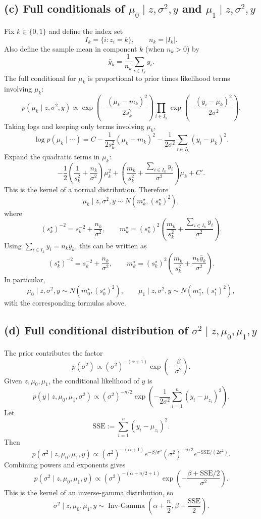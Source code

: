 \documentclass[11pt]{article}
\begin{document}
\subsection*{(c) Full conditionals of $\mu_0\mid z,\sigma^2,y$ and $\mu_1\mid z,\sigma^2,y$}
Fix $k\in\{0,1\}$ and define the index set
\[
I_k=\{i:z_i=k\},
\qquad n_k=|I_k|.
\]
Also define the sample mean in component $k$ (when $n_k>0$) by
\[
\bar y_k=\frac1{n_k}\sum_{i\in I_k} y_i.
\]
The full conditional for $\mu_k$ is proportional to prior times likelihood terms involving $\mu_k$:
\[
p(\mu_k\mid z,\sigma^2,y)\propto
\exp\left(-\frac{(\mu_k-m_k)^2}{2s_k^2}\right)
\prod_{i\in I_k}\exp\left(-\frac{(y_i-\mu_k)^2}{2\sigma^2}\right).
\]
Taking logs and keeping only terms involving $\mu_k$,
\[
\log p(\mu_k\mid \cdots)=C-\frac{1}{2s_k^2}(\mu_k-m_k)^2-\frac{1}{2\sigma^2}\sum_{i\in I_k}(y_i-\mu_k)^2.
\]
Expand the quadratic terms in $\mu_k$:
\[
-\frac{1}{2}\left(\frac{1}{s_k^2}+\frac{n_k}{\sigma^2}\right)\mu_k^2
+\left(\frac{m_k}{s_k^2}+\frac{\sum_{i\in I_k}y_i}{\sigma^2}\right)\mu_k
+ C'.
\]
This is the kernel of a normal distribution. Therefore
\[
\mu_k\mid z,\sigma^2,y\sim N(m_k^\star,(s_k^\star)^2),
\]
where
\[
(s_k^\star)^{-2}=s_k^{-2}+\frac{n_k}{\sigma^2},
\qquad
m_k^\star=(s_k^\star)^2\left(\frac{m_k}{s_k^2}+\frac{\sum_{i\in I_k}y_i}{\sigma^2}\right).
\]
Using $\sum_{i\in I_k}y_i=n_k\bar y_k$, this can be written as
\[
(s_k^\star)^{-2}=s_k^{-2}+\frac{n_k}{\sigma^2},
\qquad
m_k^\star=(s_k^\star)^2\left(\frac{m_k}{s_k^2}+\frac{n_k\bar y_k}{\sigma^2}\right).
\]
In particular,
\[
\mu_0\mid z,\sigma^2,y\sim N(m_0^\star,(s_0^\star)^2),
\qquad
\mu_1\mid z,\sigma^2,y\sim N(m_1^\star,(s_1^\star)^2),
\]
with the corresponding formulas above.

\subsection*{(d) Full conditional distribution of $\sigma^2\mid z,\mu_0,\mu_1,y$}
The prior contributes the factor
\[
p(\sigma^2)\propto (\sigma^2)^{-(\alpha+1)}\exp\left(-\frac{\beta}{\sigma^2}\right).
\]
Given $z,\mu_0,\mu_1$, the conditional likelihood of $y$ is
\[
p(y\mid z,\mu_0,\mu_1,\sigma^2)
\propto
(\sigma^2)^{-n/2}\exp\left(-\frac{1}{2\sigma^2}\sum_{i=1}^n (y_i-\mu_{z_i})^2\right).
\]
Let
\[
\mathrm{SSE}:=\sum_{i=1}^n (y_i-\mu_{z_i})^2.
\]
Then
\[
p(\sigma^2\mid z,\mu_0,\mu_1,y)
\propto
(\sigma^2)^{-(\alpha+1)}e^{-\beta/\sigma^2}
(\sigma^2)^{-n/2}e^{-\mathrm{SSE}/(2\sigma^2)}.
\]
Combining powers and exponents gives
\[
p(\sigma^2\mid z,\mu_0,\mu_1,y)
\propto
(\sigma^2)^{-(\alpha+n/2+1)}
\exp\left(-\frac{\beta+\mathrm{SSE}/2}{\sigma^2}\right).
\]
This is the kernel of an inverse-gamma distribution, so
\[
\sigma^2\mid z,\mu_0,\mu_1,y\sim \operatorname{Inv\text{-}Gamma}\left(\alpha+\frac n2,\beta+\frac{\mathrm{SSE}}{2}\right).
\]
\end{document}
